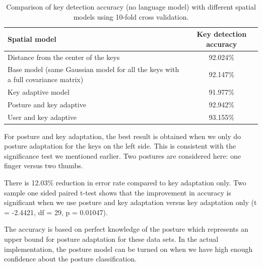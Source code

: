 \documentclass{sigchi}
\newcommand\tabhead[1]{\small\textbf{#1}}
\begin{document}
\begin{table} [tb]
  \centering
  \begin{tabular}{|l|c|}
    \hline
    \tabhead{Spatial model} &
    \multicolumn{1}{|p{0.3\columnwidth}|}{\centering\tabhead{Key detection
    accuracy}} \\
    \hline
    Distance from the center of the keys & 92.024\% \\
    \hline
    \multicolumn{1}{|p{0.7\columnwidth}|}{Base model (same Gaussian model for
    all the keys with a full covariance matrix)} & 92.147\% \\
    \hline
    Key adaptive model  & 91.977\% \\
    \hline
    Posture and key adaptive & 92.942\% \\
    \hline
    User and key adaptive   & 93.155\% \\
    \hline
  \end{tabular}
  \caption{Comparison of key detection accuracy (no language model) with
  different spatial models using 10-fold cross validation.}
  \label{tab:comparison}
\end{table}

For posture and key adaptation, the best result is obtained when we only do 
posture adaptation for the keys on the left side. This is consistent with the 
significance test we mentioned earlier. Two postures are considered here: one finger versus two thumbs.

There is 12.03\% reduction in error rate compared to key adaptation only. Two
sample one sided paired t-test shows that the improvement in accuracy is
significant when we use posture and key adaptation versus key adaptation only (t = -2.4421, df = 29, p = 0.01047).

The accuracy is based on perfect knowledge of the posture which represents an
upper bound for posture adaptation for these data sets. In the actual 
implementation, the posture model can be turned on when we have high enough 
confidence about the posture classification.
\end{document}
